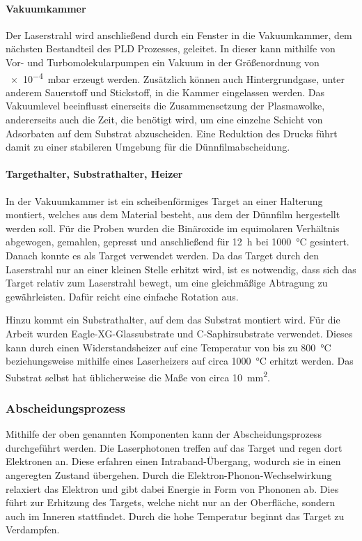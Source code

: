 \paragraph{Vakuumkammer}
Der Laserstrahl wird anschließend durch ein Fenster in die Vakuumkammer, dem nächsten Bestandteil des PLD Prozesses,
geleitet.
In dieser kann mithilfe von Vor- und Turbomolekularpumpen ein Vakuum in der Größenordnung von
\qty{e-4}{\milli\bar} erzeugt werden.
Zusätzlich können auch Hintergrundgase, unter anderem Sauerstoff und Stickstoff, in die Kammer eingelassen werden.
Das Vakuumlevel beeinflusst einerseits die Zusammensetzung der Plasmawolke, andererseits auch die
Zeit, die benötigt wird, um eine einzelne Schicht von Adsorbaten auf dem Substrat abzuscheiden.
Eine Reduktion des Drucks führt damit zu einer stabileren Umgebung für die Dünnfilmabscheidung.\autocite[2297-2298]{pld}

\paragraph{Targethalter, Substrathalter, Heizer}
In der Vakuumkammer ist ein scheibenförmiges Target an einer Halterung montiert, welches aus dem Material besteht, aus
dem der Dünnfilm hergestellt werden soll.
Für die \heo Proben wurden die Binäroxide im equimolaren Verhältnis abgewogen, gemahlen, gepresst und anschließend
für \qty{12}{\hour} bei \qty{1000}{\celsius} gesintert.
Danach konnte es als Target verwendet werden.
Da das Target durch den Laserstrahl nur an einer kleinen Stelle erhitzt wird, ist es notwendig,
dass sich das Target relativ zum Laserstrahl bewegt, um eine gleichmäßige Abtragung zu gewährleisten.
Dafür reicht eine einfache Rotation aus.

Hinzu kommt ein Substrathalter, auf dem das Substrat montiert wird.
Für die Arbeit wurden Eagle-XG-Glassubstrate und C-Saphirsubstrate verwendet.
Dieses kann durch einen Widerstandsheizer auf eine Temperatur von bis zu \qty{800}{\celsius} beziehungsweise
mithilfe eines Laserheizers auf circa \qty{1000}{\celsius} erhitzt werden.
Das Substrat selbst hat üblicherweise die Maße von circa \qty{10}{\milli\meter\squared}.

\autocite[2299]{pld}

\subsubsection{Abscheidungsprozess}
Mithilfe der oben genannten Komponenten kann der Abscheidungsprozess durchgeführt werden.
Die Laserphotonen treffen auf das Target und regen dort Elektronen an.
Diese erfahren einen Intraband-Übergang, wodurch sie in einen angeregten Zustand übergehen.
Durch die Elektron-Phonon-Wechselwirkung relaxiert das Elektron und gibt dabei Energie in Form von Phononen ab.
Dies führt zur Erhitzung des Targets, welche nicht nur an der Oberfläche, sondern auch im Inneren stattfindet.
Durch die hohe Temperatur beginnt das Target zu Verdampfen.


